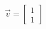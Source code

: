 \documentclass[preview]{standalone}
\begin{document}
\begin{align*}
\vec{v}=\begin{bmatrix}1\\1\end{bmatrix}
\end{align*}
\end{document}
